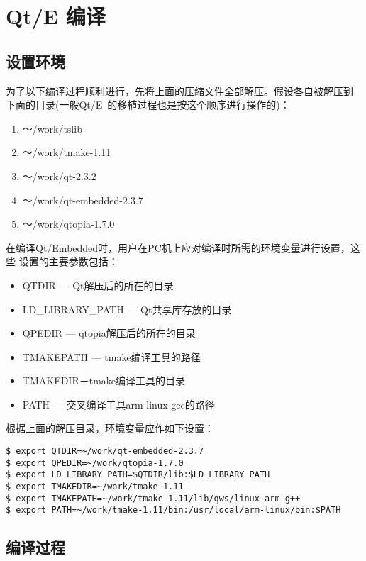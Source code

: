 \section{Qt/E 编译}
\subsection{设置环境}
	为了以下编译过程顺利进行，先将上面的压缩文件全部解压。假设各自被解压到
下面的目录(一般Qt/E~的移植过程也是按这个顺序进行操作的)：
\begin{enumerate}\itemsep=-3pt
  \item ～/work/tslib
  \item ～/work/tmake-1.11
  \item ～/work/qt-2.3.2
  \item ～/work/qt-embedded-2.3.7
  \item ～/work/qtopia-1.7.0
\end{enumerate}

	在编译Qt/Embedded时，用户在PC机上应对编译时所需的环境变量进行设置，这些
设置的主要参数包括：
\begin{itemize}\itemsep=-3pt
  \item QTDIR --- Qt解压后的所在的目录
  \item LD\_LIBRARY\_PATH --- Qt共享库存放的目录
  \item QPEDIR --- qtopia解压后的所在的目录
  \item TMAKEPATH --- tmake编译工具的路径
  \item TMAKEDIR－tmake编译工具的目录
  \item PATH --- 交叉编译工具arm-linux-gcc的路径
\end{itemize}

	根据上面的解压目录，环境变量应作如下设置：

\begin{boxedminipage}{.9\textwidth}
\begin{verbatim}
$ export QTDIR=~/work/qt-embedded-2.3.7
$ export QPEDIR=~/work/qtopia-1.7.0
$ export LD_LIBRARY_PATH=$QTDIR/lib:$LD_LIBRARY_PATH
$ export TMAKEDIR=~/work/tmake-1.11
$ export TMAKEPATH=~/work/tmake-1.11/lib/qws/linux-arm-g++
$ export PATH=~/work/tmake-1.11/bin:/usr/local/arm-linux/bin:$PATH
\end{verbatim}
\end{boxedminipage}

\subsection{编译过程}
